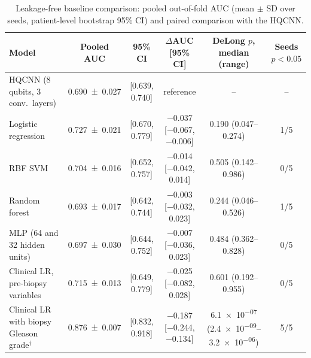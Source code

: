 \begin{table}[tbp]
\centering
\caption{Leakage-free baseline comparison: pooled out-of-fold AUC (mean $\pm$ SD over seeds, patient-level bootstrap 95\% CI) and paired comparison with the HQCNN.}
\label{tab:s_p1_comparisons}
\scriptsize\setlength{\tabcolsep}{3pt}
\begin{tabular}{>{\raggedright\arraybackslash}p{3.6cm}ccccc}
\toprule
Model & Pooled AUC & 95\% CI & $\Delta$AUC [95\% CI] & DeLong $p$, median (range) & Seeds $p<0.05$ \\
\midrule
HQCNN (8 qubits, 3 conv.\ layers) & \num{0.690 \pm 0.027} & [\num{0.639}, \num{0.740}] & reference & -- & -- \\
Logistic regression & \num{0.727 \pm 0.021} & [\num{0.670}, \num{0.779}] & \num{-0.037} [\num{-0.067}, \num{-0.006}] & \num{0.190} (\num{0.047}--\num{0.274}) & \num{1}/\num{5} \\
RBF SVM & \num{0.704 \pm 0.016} & [\num{0.652}, \num{0.757}] & \num{-0.014} [\num{-0.042}, \num{+0.014}] & \num{0.505} (\num{0.142}--\num{0.986}) & \num{0}/\num{5} \\
Random forest & \num{0.693 \pm 0.017} & [\num{0.642}, \num{0.744}] & \num{-0.003} [\num{-0.032}, \num{+0.023}] & \num{0.244} (\num{0.046}--\num{0.526}) & \num{1}/\num{5} \\
MLP (64 and 32 hidden units) & \num{0.697 \pm 0.030} & [\num{0.644}, \num{0.752}] & \num{-0.007} [\num{-0.036}, \num{+0.023}] & \num{0.484} (\num{0.362}--\num{0.828}) & \num{0}/\num{5} \\
Clinical LR, pre-biopsy variables & \num{0.715 \pm 0.013} & [\num{0.649}, \num{0.779}] & \num{-0.025} [\num{-0.082}, \num{+0.028}] & \num{0.601} (\num{0.192}--\num{0.955}) & \num{0}/\num{5} \\
Clinical LR with biopsy Gleason grade$^{\dagger}$ & \num{0.876 \pm 0.007} & [\num{0.832}, \num{0.918}] & \num{-0.187} [\num{-0.244}, \num{-0.134}] & \num{6.1e-07} (\num{2.4e-09}--\num{3.2e-06}) & \num{5}/\num{5} \\
\bottomrule
\end{tabular}
\par{}
\end{table}

